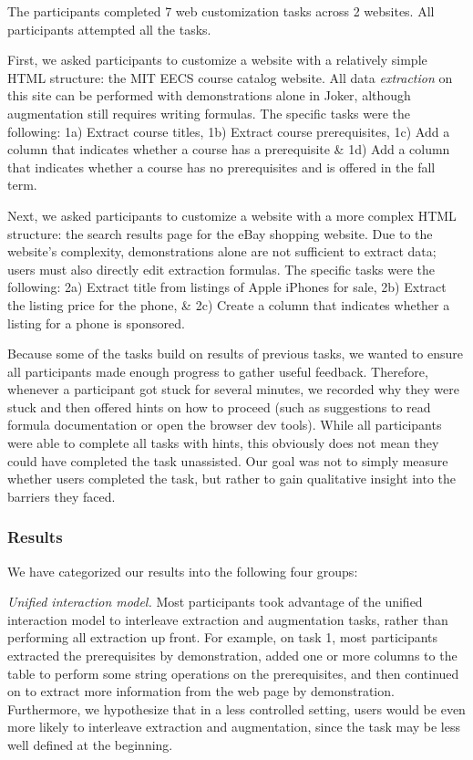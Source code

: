\documentclass[sigconf,10pt]{acmart}
\begin{document}
The participants completed 7 web customization tasks across 2 websites.
All participants attempted all the tasks.

First, we asked participants to customize a website with a relatively
simple HTML structure: the MIT EECS course catalog website. All data
\emph{extraction} on this site can be performed with demonstrations
alone in Joker, although augmentation still requires writing formulas.
The specific tasks were the following: 1a) Extract course titles, 1b)
Extract course prerequisites, 1c) Add a column that indicates whether a
course has a prerequisite \& 1d) Add a column that indicates whether a
course has no prerequisites and is offered in the fall term.

Next, we asked participants to customize a website with a more complex
HTML structure: the search results page for the eBay shopping website.
Due to the website's complexity, demonstrations alone are not sufficient
to extract data; users must also directly edit extraction formulas. The
specific tasks were the following: 2a) Extract title from listings of
Apple iPhones for sale, 2b) Extract the listing price for the phone, \&
2c) Create a column that indicates whether a listing for a phone is
sponsored.

Because some of the tasks build on results of previous tasks, we wanted
to ensure all participants made enough progress to gather useful
feedback. Therefore, whenever a participant got stuck for several
minutes, we recorded why they were stuck and then offered hints on how
to proceed (such as suggestions to read formula documentation or open
the browser dev tools). While all participants were able to complete all
tasks with hints, this obviously does not mean they could have completed
the task unassisted. Our goal was not to simply measure whether users
completed the task, but rather to gain qualitative insight into the
barriers they faced.

\hypertarget{results}{%
\subsubsection{Results}\label{results}}

We have categorized our results into the following four groups:

\emph{Unified interaction model.} Most participants took advantage of
the unified interaction model to interleave extraction and augmentation
tasks, rather than performing all extraction up front. For example, on
task 1, most participants extracted the prerequisites by demonstration,
added one or more columns to the table to perform some string operations
on the prerequisites, and then continued on to extract more information
from the web page by demonstration. Furthermore, we hypothesize that in
a less controlled setting, users would be even more likely to interleave
extraction and augmentation, since the task may be less well defined at
the beginning.
\end{document}
